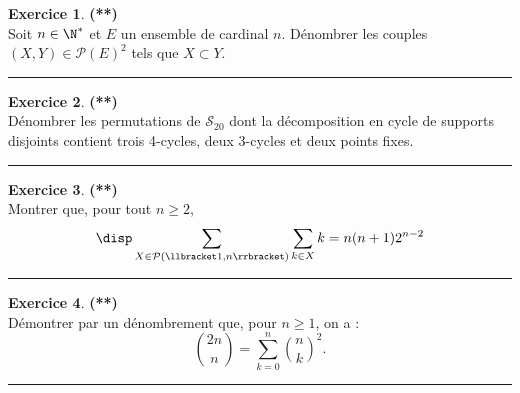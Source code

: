 \documentclass[a4paper,11pt]{article}
\theoremstyle{definition}
\newtheorem{exo}{Exercice} %
\begin{document}
\begin{minipage}{1\linewidth}\begin{minipage}[t]{0.48\linewidth}\raggedright

\begin{exo}\textbf{(**)}\quad\\[0.2cm]
Soit $n \in \N^*$ et $E$ un ensemble de cardinal $n $. Dénombrer les couples $(X , Y ) \in \mathcal P (E )^2$ tels que $X \subset Y $.	
	
	
	\centering\rule{1\linewidth}{0.6pt}\end{exo}



\begin{exo}\textbf{(**)}\quad\\[0.2cm]
Dénombrer les permutations de $\mathcal S_{20}$ dont la décomposition en cycle de supports disjoints contient trois 4-cycles, deux 3-cycles et deux points fixes.
	
\centering\rule{1\linewidth}{0.6pt}\end{exo}




\end{minipage}\hfill\vrule\hfill\begin{minipage}[t]{0.48\linewidth}\raggedright

\begin{exo}\textbf{(**)}\quad\\[0.2cm]
Montrer que, pour tout $n \geq 2$,
$$\disp \sum_{X \in \mathcal{P} (\llbracket 1,n \rrbracket) }\sum_{k \in X}k = n (n + 1)2^{n-2}$$	
	
	\centering\rule{1\linewidth}{0.6pt}\end{exo}


\begin{exo}\textbf{(**)}\quad\\[0.2cm]
Démontrer par un dénombrement que, pour $n\geq 1$, on a :
$$\binom{2n}{n}=\sum_{k=0}^n \binom{n}{k}^2.$$	
	
	\centering\rule{1\linewidth}{0.6pt}\end{exo}


\end{minipage}\end{minipage}\newpage

\hfill\\[2cm]
\end{document}
